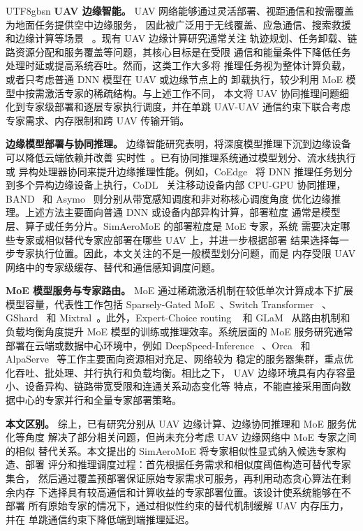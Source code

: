 \documentclass[conference]{IEEEtran}
\begin{document}
\begin{CJK*}{UTF8}{gbsn}
\textbf{UAV 边缘智能。}
UAV 网络能够通过灵活部署、视距通信和按需覆盖为地面任务提供空中边缘服务，
因此被广泛用于无线覆盖、应急通信、搜索救援和边缘计算等场景
~\cite{mozaffari2019uav,zhu2019uav}。现有 UAV 边缘计算研究通常关注
轨迹规划、任务卸载、链路资源分配和服务覆盖等问题，其核心目标是在受限
通信和能量条件下降低任务处理时延或提高系统吞吐。然而，这类工作大多将
推理任务视为整体计算负载，或者只考虑普通 DNN 模型在 UAV 或边缘节点上的
卸载执行，较少利用 MoE 模型中按需激活专家的稀疏结构。与上述工作不同，
本文将 UAV 协同推理问题细化到专家级部署和逐层专家执行调度，并在单跳
UAV-UAV 通信约束下联合考虑专家需求、内存限制和跨 UAV 传输开销。

\textbf{边缘模型部署与协同推理。}
边缘智能研究表明，将深度模型推理下沉到边缘设备可以降低云端依赖并改善
实时性~\cite{zhou2019edge}。已有协同推理系统通过模型划分、流水线执行或
异构处理器协同来提升边缘推理性能。例如，CoEdge~\cite{zeng2020coedge}
将 DNN 推理任务划分到多个异构边缘设备上执行，CoDL~\cite{jia2022codl}
关注移动设备内部 CPU-GPU 协同推理，BAND~\cite{jeong2022band} 和
Asymo~\cite{wang2021asymo} 则分别从带宽感知调度和非对称核心调度角度
优化边缘推理。上述方法主要面向普通 DNN 或设备内部异构计算，部署粒度
通常是模型层、算子或任务分片。SimAeroMoE 的部署粒度是 MoE 专家，系统
需要决定哪些专家或相似替代专家应部署在哪些 UAV 上，并进一步根据部署
结果选择每一步专家执行位置。因此，本文关注的不是一般模型划分问题，而是
内存受限 UAV 网络中的专家级缓存、替代和通信感知调度问题。

\textbf{MoE 模型服务与专家路由。}
MoE 通过稀疏激活机制在较低单次计算成本下扩展模型容量，代表性工作包括
Sparsely-Gated MoE~\cite{shazeer2017moe}、Switch Transformer
~\cite{fedus2022switch}、GShard~\cite{lepikhin2021gshard} 和
Mixtral~\cite{jiang2024mixtral}。此外，Expert-Choice routing
~\cite{zhou2022mixtureofexperts_routing} 和 GLaM~\cite{du2022glam}
从路由机制和负载均衡角度提升 MoE 模型的训练或推理效率。系统层面的
MoE 服务研究通常部署在云端或数据中心环境中，例如 DeepSpeed-Inference
~\cite{aminabadi2022deepspeed}、Orca~\cite{yu2022orca} 和
AlpaServe~\cite{li2023alpaserve} 等工作主要面向资源相对充足、网络较为
稳定的服务器集群，重点优化吞吐、批处理、并行执行和负载均衡。相比之下，
UAV 边缘环境具有内存容量小、设备异构、链路带宽受限和连通关系动态变化等
特点，不能直接采用面向数据中心的专家并行和全量专家部署策略。

\textbf{本文区别。}
综上，已有研究分别从 UAV 边缘计算、边缘协同推理和 MoE 服务优化等角度
解决了部分相关问题，但尚未充分考虑 UAV 边缘网络中 MoE 专家之间的相似
替代关系。本文提出的 SimAeroMoE 将专家相似性显式纳入候选专家构造、部署
评分和推理调度过程：首先根据任务需求和相似度阈值构造可替代专家集合，
然后通过覆盖预部署保证原始专家需求可服务，再利用动态贪心算法在剩余内存
下选择具有较高通信和计算收益的专家部署位置。该设计使系统能够在不部署
所有原始专家的情况下，通过相似性约束的替代机制缓解 UAV 内存压力，并在
单跳通信约束下降低端到端推理延迟。


\end{CJK*}
\end{document}
